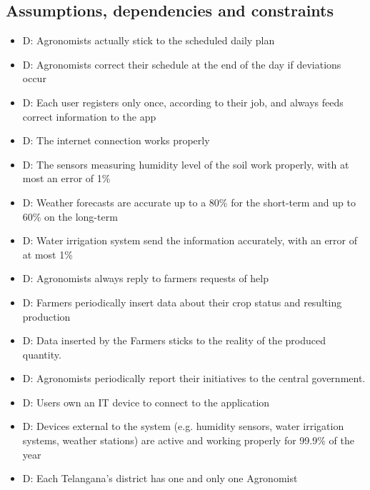 \documentclass[table, 12pt]{article}
\begin{document}
\subsection{Assumptions, dependencies and constraints}
\begin{itemize}
    \item {}D: Agronomists actually stick to the scheduled daily plan
    \item {}D: Agronomists correct their schedule at the end of the day if deviations occur
    \item {}D: Each user registers only once, according to their job, and always feeds correct information to the app
    \item {}D: The internet connection works properly
    \item {}D: The sensors measuring humidity level of the soil work properly, with at most an error of 1\%
    \item {}D: Weather forecasts are accurate up to a 80\% for the short-term and up to 60\% on the long-term
    \item {}D: Water irrigation system send the information accurately, with an error of at most 1\%
    \item {}D: Agronomists always reply to farmers requests of help
    \item {}D: Farmers periodically insert data about their crop status and resulting production
    \item {}D: Data inserted by the Farmers sticks to the reality of the produced quantity.
    \item {}D: Agronomists periodically report their initiatives to the central government.
    \item {}D: Users own an IT device to connect to the application
    \item {}D: Devices external to the system (e.g. humidity sensors, water irrigation systems, weather stations) are active and working properly for 99.9\% of the year
    \item {}D: Each Telangana's district has one and only one Agronomist
\end{itemize}
\newpage
\end{document}
